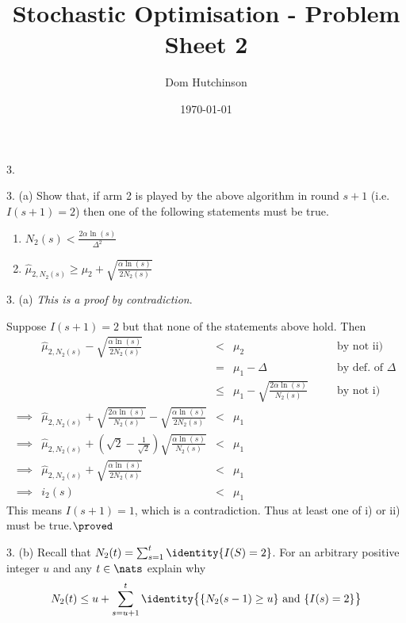 \documentclass[11pt,a4paper]{article}
\begin{document}

\title{Stochastic Optimisation - Problem Sheet 2}
\author{Dom Hutchinson}
\date{\today}
\maketitle


\begin{question}{3.}
\end{question}

\begin{question}{3. (a)}
  Show that, if arm 2 is played by the above algorithm in round $s+1$ (i.e. $I(s+1)=2$) then one of the following statements must be true.
  \begin{enumerate}
    \item $\displaystyle N_2(s)<\frac{2\alpha\ln(s)}{\Delta^2}$
    \item $\displaystyle\hat\mu_{2,N_2(s)}\geq\mu_2+\sqrt{\frac{\alpha\ln(s)}{2N_2(s)}}$
  \end{enumerate}
\end{question}

\begin{answer}{3. (a)}
  \textit{This is a proof by contradiction}.
  \par Suppose $I(s+1)=2$ but that none of the statements above hold. Then
  \[\begin{array}{rrclcl}
    &\hat\mu_{2,N_2(s)}-\sqrt{\frac{\alpha\ln(s)}{2N_2(s)}}&<&\mu_2&\quad&\text{by not ii)}\\
    &&=&\mu_1-\Delta&&\text{by def. of }\Delta\\
    &&\leq&\mu_1-\sqrt{\frac{2\alpha\ln(s)}{N_2(s)}}&&\text{by not i)}\\
    \implies&\hat\mu_{2,N_2(s)}+\sqrt{\frac{2\alpha\ln(s)}{N_2(s)}}-\sqrt{\frac{\alpha\ln(s)}{2N_2(s)}}&<&\mu_1\\
    \implies&\hat\mu_{2,N_2(s)}+\left(\sqrt2-\frac1{\sqrt2}\right)\sqrt{\frac{\alpha\ln(s)}{N_2(s)}}&<&\mu_1\\
    \implies&\hat\mu_{2,N_2(s)}+\sqrt{\frac{\alpha\ln(s)}{2N_2(s)}}&<&\mu_1\\
    \implies&i_2(s)&<&\mu_1
  \end{array}\]
  This means $I(s+1)=1$, which is a contradiction. Thus at least one of i) or ii) must be true.$\proved$
\end{answer}

\begin{question}{3. (b)}
  Recall that $N_2(t)=\sum_{s=1}^t\identity\{I(S)=2\}$. For an arbitrary positive integer $u$ and any $t\in\nats$ explain why
  \[ N_2(t)\leq u+\sum_{s=u+1}^t\identity\big\{\{N_2(s-1)\geq u\}\text{ and }\{I(s)=2\}\big\} \]
\end{question}
\end{document}
